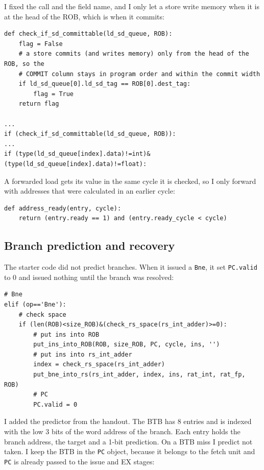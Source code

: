 \documentclass[11pt]{article}
\renewcommand{\_}{\origunderscore\allowbreak}
\begin{document}
I fixed the call and the field name, and I only let a store write memory when it is at the head
of the ROB, which is when it commits:

\begin{lstlisting}
def check_if_sd_committable(ld_sd_queue, ROB):
    flag = False
    # a store commits (and writes memory) only from the head of the ROB, so the
    # COMMIT column stays in program order and within the commit width
    if ld_sd_queue[0].ld_sd_tag == ROB[0].dest_tag:
        flag = True
    return flag

...
if (check_if_sd_committable(ld_sd_queue, ROB)):
...
if (type(ld_sd_queue[index].data)!=int)&(type(ld_sd_queue[index].data)!=float):
\end{lstlisting}

A forwarded load gets its value in the same cycle it is checked, so I only forward with addresses
that were calculated in an earlier cycle:

\begin{lstlisting}
def address_ready(entry, cycle):
    return (entry.ready == 1) and (entry.ready_cycle < cycle)
\end{lstlisting}

\subsection{Branch prediction and recovery}

The starter code did not predict branches. When it issued a \texttt{Bne}, it set
\texttt{PC.valid} to 0 and issued nothing until the branch was resolved:

\begin{lstlisting}
# Bne 
elif (op=='Bne'):
    # check space
    if (len(ROB)<size_ROB)&(check_rs_space(rs_int_adder)>=0):
        # put ins into ROB
        put_ins_into_ROB(ROB, size_ROB, PC, cycle, ins, '')
        # put ins into rs_int_adder
        index = check_rs_space(rs_int_adder)
        put_bne_into_rs(rs_int_adder, index, ins, rat_int, rat_fp, ROB)
        # PC
        PC.valid = 0
\end{lstlisting}

I added the predictor from the handout. The BTB has 8 entries and is indexed with the low 3 bits
of the word address of the branch. Each entry holds the branch address, the target and a 1-bit
prediction. On a BTB miss I predict not taken. I keep the BTB in the \texttt{PC} object, because
it belongs to the fetch unit and \texttt{PC} is already passed to the issue and EX stages:
\end{document}
